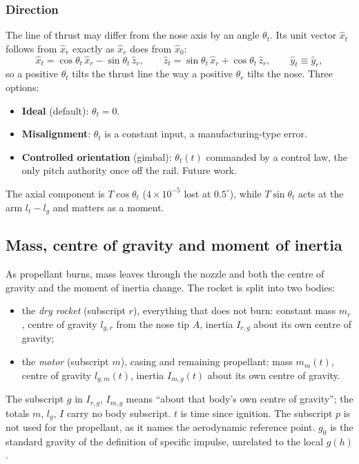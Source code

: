 \subsubsection{Direction}
The line of thrust may differ from the nose axis by an angle $\theta_t$. Its unit vector
$\hat{x}_t$ follows from $\hat{x}_r$ exactly as $\hat{x}_r$ does from $\hat{x}_0$:
\begin{equation}\label{eq:thrust_frame}
    \hat{x}_t = \cos\theta_t\,\hat{x}_r - \sin\theta_t\,\hat{z}_r, \qquad
    \hat{z}_t = \sin\theta_t\,\hat{x}_r + \cos\theta_t\,\hat{z}_r, \qquad \hat{y}_t\equiv\hat{y}_r,
\end{equation}
so a positive $\theta_t$ tilts the thrust line the way a positive $\theta_r$ tilts the nose. Three
options:
\begin{itemize}
    \item \textbf{Ideal} (default): $\theta_t=0$.
    \item \textbf{Misalignment}: $\theta_t$ is a constant input, a manufacturing-type error.
    \item \textbf{Controlled orientation} (gimbal): $\theta_t(t)$ commanded by a control law, the
    only pitch authority once off the rail. Future work.
\end{itemize}
The axial component is $T\cos\theta_t$ ($4\times10^{-5}$ lost at $0.5^\circ$), while
$T\sin\theta_t$ acts at the arm $l_t-l_g$ and matters as a moment.

\subsection{Mass, centre of gravity and moment of inertia}\label{sec:mass}
As propellant burns, mass leaves through the nozzle and both the centre of gravity and the moment
of inertia change. The rocket is split into two bodies:
\begin{itemize}
    \item the \emph{dry rocket} (subscript $r$), everything that does not burn: constant mass
    $m_r$, centre of gravity $l_{g,r}$ from the nose tip $A$, inertia $I_{r,g}$ about its own
    centre of gravity;
    \item the \emph{motor} (subscript $m$), casing and remaining propellant: mass $m_m(t)$, centre
    of gravity $l_{g,m}(t)$, inertia $I_{m,g}(t)$ about its own centre of gravity.
\end{itemize}
The subscript $g$ in $I_{r,g}$, $I_{m,g}$ means ``about that body's own centre of gravity''; the
totals $m$, $l_g$, $I$ carry no body subscript. $t$ is time since ignition. The subscript $p$ is not
used for the propellant, as it names the aerodynamic reference point. $g_0$ is the standard
gravity of the definition of specific impulse, unrelated to the local $g(h)$.

